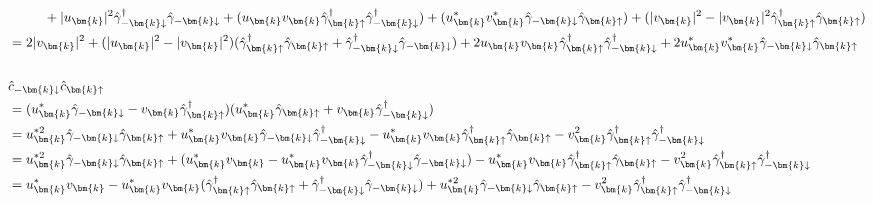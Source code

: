\documentclass[dvipdfmx, 11pt, a4paper]{jsarticle}
\numberwithin{equation}{section}
\theoremstyle{definition}
\begin{document}
\begin{derivationBox}
\begin{align}
            &\ \ \ \ \ \ \ \ + |u_{\bm{k}}|^2 \hat{\gamma}_{-\bm{k}\downarrow}^\dagger \hat{\gamma}_{-\bm{k}\downarrow} +  (u_{\bm{k}}v_{\bm{k}}   \hat{\gamma}_{\bm{k}\uparrow}^\dagger \hat{\gamma}_{-\bm{k}\downarrow}^\dagger ) + (u_{\bm{k}}^* v_{\bm{k}}^*  \hat{\gamma}_{-\bm{k}\downarrow} \hat{\gamma}_{\bm{k}\uparrow}) + (|v_{\bm{k}}|^2 - |v_{\bm{k}}|^2  \hat{\gamma}_{\bm{k}\uparrow}^\dagger \hat{\gamma}_{\bm{k}\uparrow}) \notag \\
            &= 2|v_{\bm{k}}|^2 + (|u_{\bm{k}}|^2 - |v_{\bm{k}}|^2)(\hat{\gamma}_{\bm{k}\uparrow}^\dagger \hat{\gamma}_{\bm{k}\uparrow} + \hat{\gamma}_{-\bm{k}\downarrow}^\dagger\hat{\gamma}_{-\bm{k}\downarrow}) +2u_{\bm{k}}v_{\bm{k}} \hat{\gamma}_{\bm{k}\uparrow}^\dagger  \hat{\gamma}_{-\bm{k}\downarrow}^\dagger + 2u_{\bm{k}}^* v_{\bm{k}}^* \hat{\gamma}_{-\bm{k}\downarrow}\hat{\gamma}_{\bm{k}\uparrow} \\ \notag \\
            &\hat{c}_{-\bm{k}\downarrow}\hat{c}_{\bm{k}\uparrow} \notag \\ 
            &= ( u_{\bm{k}}^* \hat{\gamma}_{-\bm{k}\downarrow} - v_{\bm{k}}\hat{\gamma}_{\bm{k}\uparrow}^\dagger)(u_{\bm{k}}^* \hat{\gamma}_{\bm{k}\uparrow} + v_{\bm{k}} \hat{\gamma}_{-\bm{k}\downarrow}^\dagger) \notag \\
            &= u_{\bm{k}}^{*2} \hat{\gamma}_{-\bm{k}\downarrow}    \hat{\gamma}_{\bm{k}\uparrow} + u_{\bm{k}}^* v_{\bm{k}} \hat{\gamma}_{-\bm{k}\downarrow}  \hat{\gamma}_{-\bm{k}\downarrow}^\dagger - u_{\bm{k}}^* v_{\bm{k}}\hat{\gamma}_{\bm{k}\uparrow}^\dagger  \hat{\gamma}_{\bm{k}\uparrow} - v_{\bm{k}}^2 \hat{\gamma}_{\bm{k}\uparrow}^\dagger  \hat{\gamma}_{-\bm{k}\downarrow}^\dagger \notag \\
            &= u_{\bm{k}}^{*2} \hat{\gamma}_{-\bm{k}\downarrow}    \hat{\gamma}_{\bm{k}\uparrow} + (u_{\bm{k}}^* v_{\bm{k}} - u_{\bm{k}}^* v_{\bm{k}}    \hat{\gamma}_{-\bm{k}\downarrow}^\dagger \hat{\gamma}_{-\bm{k}\downarrow})- u_{\bm{k}}^* v_{\bm{k}}\hat{\gamma}_{\bm{k}\uparrow}^\dagger  \hat{\gamma}_{\bm{k}\uparrow} - v_{\bm{k}}^2 \hat{\gamma}_{\bm{k}\uparrow}^\dagger  \hat{\gamma}_{-\bm{k}\downarrow}^\dagger \notag \\
            &= u_{\bm{k}}^* v_{\bm{k}} - u_{\bm{k}}^* v_{\bm{k}} (\hat{\gamma}_{\bm{k}\uparrow}^\dagger  \hat{\gamma}_{\bm{k}\uparrow} + \hat{\gamma}_{-\bm{k}\downarrow}^\dagger \hat{\gamma}_{-\bm{k}\downarrow}) + u_{\bm{k}}^{*2} \hat{\gamma}_{-\bm{k}\downarrow}    \hat{\gamma}_{\bm{k}\uparrow} - v_{\bm{k}}^2 \hat{\gamma}_{\bm{k}\uparrow}^\dagger  \hat{\gamma}_{-\bm{k}\downarrow}^\dagger\\ \notag \\

\end{align}
\end{derivationBox}
\end{document}
